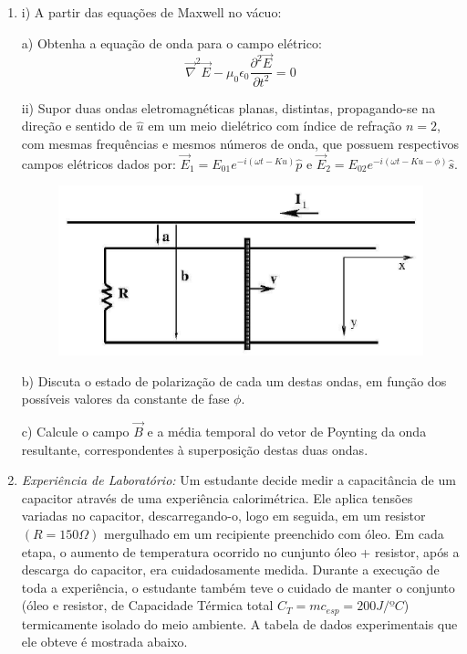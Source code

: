\begin{enumerate}[start=1,label={\bfseries Q\arabic*.}]
\resposta


\item i) A partir das equações de Maxwell no vácuo:

a) Obtenha a equação de onda para o campo elétrico:
$$
\vec{\nabla}^{2} \vec{E} - \mu_{0} \epsilon_{0} \frac{\partial^{2} \vec{E}}{\partial t^{2}} = 0
$$

ii) Supor duas ondas eletromagnéticas planas, distintas, propagando-se na direção e sentido de $\hat{u}$ em um meio dielétrico com índice de refração $n=2$, com mesmas frequências e mesmos números de onda, que possuem respectivos campos elétricos dados por: $\vec{E}_{1} = E_{01} e^{-i(\omega t - K u)} \hat{p}$ e $\vec{E}_{2} = E_{02} e^{-i(\omega t - K u - \phi)} \hat{s}$.
\begin{figure}[H]
\centering
\includegraphics[scale=0.8]{eletromag-img/haste.png}
\end{figure}

\resposta

b) Discuta o estado de polarização de cada um destas ondas, em função dos possíveis valores da constante de fase $\phi$.

\resposta

c) Calcule o campo $\vec{B}$ e a média temporal do vetor de Poynting da onda resultante, correspondentes à superposição destas duas ondas.

\resposta


\item \textit{Experiência de Laboratório:} Um estudante decide medir a capacitância de um capacitor através de uma experiência calorimétrica. Ele aplica tensões variadas no capacitor, descarregando-o, logo em seguida, em um resistor $(R = 150 \Omega)$ mergulhado em um recipiente preenchido com óleo. Em cada etapa, o aumento de temperatura ocorrido no cunjunto óleo + resistor, após a descarga do capacitor, era cuidadosamente medida. Durante a execução de toda a experiência, o estudante também teve o cuidado de manter o conjunto (óleo e resistor, de Capacidade Térmica total $C_{T} = mc_{esp} = 200 J/ºC$) termicamente isolado do meio ambiente. A tabela de dados experimentais que ele obteve é mostrada abaixo.


\end{enumerate}
